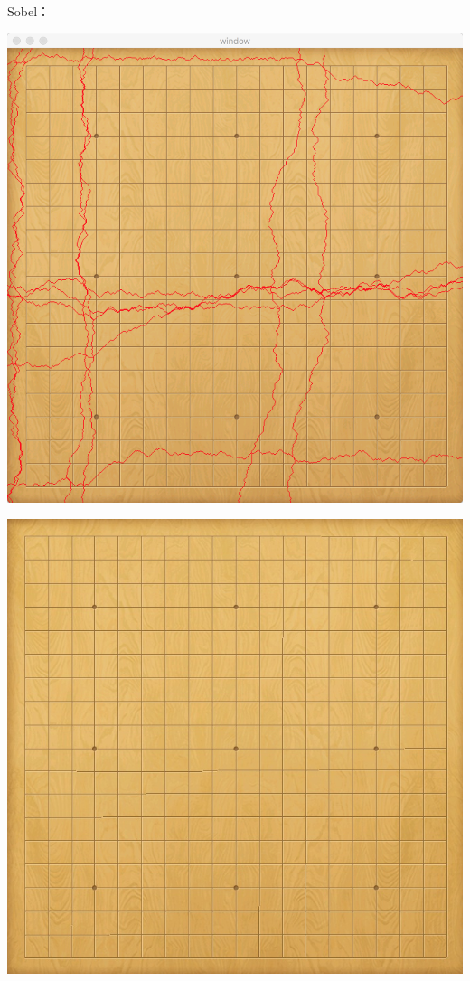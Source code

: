 \documentclass[10pt, a4paper]{article}
\begin{document}
    Sobel：

    \includegraphics[scale = .1]{2sobelseam.png}

    \includegraphics[scale = .3]{2sobel.jpg}
\end{document}
